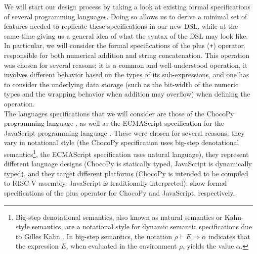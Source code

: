 We will start our design process by taking a look at existing formal specifications of several programming languages. Doing so allows us to derive a minimal set of features needed to replicate these specifications in our new \ac{DSL}, while at the same time giving us a general idea of what the syntax of the \ac{DSL} may look like. In particular, we will consider the formal specifications of the plus (\texttt{+}) operator, responsible for both numerical addition and string concatenation. This operation was chosen for several reasons: it is a common and well-understood operation, it involves different behavior based on the types of its sub-expressions, and one has to consider the underlying data storage (such as the bit-width of the numeric types and the wrapping behavior when addition may overflow) when defining the operation.\\

The languages specifications that we will consider are those of the ChocoPy programming language \cite{PhadyeSH19-SPLASHE}, as well as the ECMAScript specification for the JavaScript programming language \cite{ecma1999262}. These were chosen for several reasons: they vary in notational style (the ChocoPy specification uses big-step denotational semantics\footnote{Big-step denotational semantics, also known as natural semantics or Kahn-style semantics, are a notational style for dynamic semantic specifications due to Gilles Kahn \cite{Kahn87:0}. In big-step semantics, the notation $\rho \vdash E \Rightarrow \alpha$ indicates that the expression $E$, when evaluated in the environment $\rho$, yields the value $\alpha$.}, the ECMAScript specification uses natural language), they represent different language designs (ChocoPy is statically typed, JavaScript is dynamically typed), and they target different platforms (ChocoPy is intended to be compiled to RISC-V assembly, JavaScript is traditionally interpreted).  show formal specifications of the plus operator for ChocoPy and JavaScript, respectively.\\

